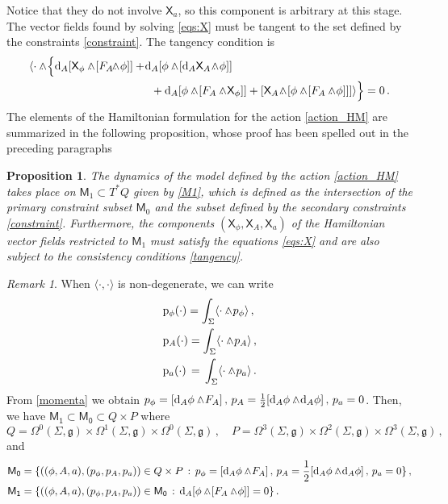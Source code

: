 \documentclass[12pt]{amsart}
\theoremstyle{plain}
\newtheorem{proposition}[theorem]{Proposition}
\theoremstyle{definition}
\theoremstyle{remark}
\newtheorem{remark}[theorem]{Remark}
\newcommand{\wed}{\wedge\hspace*{-7.5pt}.\hspace*{3pt}}
\numberwithin{equation}{section}  %
\begin{document}
Notice that they do not involve $\mathsf{X}_{a}$, so this component is arbitrary at this stage. The vector fields found by solving \eqref{eqs:X} must be tangent to the set defined by the constraints \eqref{constraint}. The tangency condition is
\begin{align}
  \label{tangency}\begin{split}
&\langle\cdot\wed \Big\{{\mathrm{d}_A[\mathsf{X}_\phi\wed[F_A\!\!\wed\phi]]}+\!{\mathrm{d}_A[\phi\wed [\mathrm{d}_A \mathsf{X}_A\!\wed \phi]]}\\
&\hspace{3.8cm}+{\mathrm{d}_A[\phi\wed[F_A \wed \mathsf{X}_\phi]]}+{[\mathsf{X}_A \!\wed [\phi\wed[F_A \wed\phi]]]}\rangle\Big\}=0\,. \end{split}
\end{align}
The elements of the Hamiltonian formulation for the action \eqref{action_HM} are summarized in the following proposition, whose proof has been spelled out in the preceding paragraphs
\begin{proposition}\label{th_Hamiltonian}
The dynamics of the model defined by the action \eqref{action_HM} takes place on $\mathsf{M}_1\subset T^*Q$ given by \eqref{M1}, which is defined as the intersection of the primary constraint subset $\mathsf{M}_0$ and the subset defined by the secondary constraints \eqref{constraint}. Furthermore, the components $(\mathsf{X}_\phi,\mathsf{X}_A, \mathsf{X}_{a})$ of the Hamiltonian vector fields restricted to $\mathsf{M}_1$ must satisfy the equations \eqref{eqs:X} and are also subject to the consistency conditions \eqref{tangency}.
\end{proposition}
\begin{remark}\label{remark_ps} When \(\langle \cdot,\!\cdot\rangle\) is non-degenerate, we can write  
\begin{align*}
&\mathrm{p}_\phi(\cdot)=\int_\Sigma\langle \cdot\wed p_\phi \rangle\,, \nonumber\\
&\mathrm{p}_A(\cdot)=\int_\Sigma \langle \cdot \wed p_A \rangle\,,\\
&\mathrm{p}_{a}(\cdot)\,=\,\int_\Sigma\langle \cdot\wed p_a \rangle\,. 
\end{align*}
From \eqref{momenta} we obtain \(p_\phi=[\mathrm{d}_A\phi\wed F_A]\,,\, p_A=\frac{1}{2}[\mathrm{d}_A\phi\wed \mathrm{d}_A\phi]\,, \, p_a=0\). Then, we have \(\mathsf{M_1}\subset\mathsf{M_0}\subset Q\times P\) where
\[
Q=\Omega^0(\Sigma,\mathfrak{g})\times\Omega^1(\Sigma,\mathfrak{g})\times\Omega^0(\Sigma,\mathfrak{g})\,,\quad 
P=\Omega^3(\Sigma,\mathfrak{g})\times\Omega^2(\Sigma,\mathfrak{g})\times\Omega^3(\Sigma,\mathfrak{g})\,, 
\]
and
\begin{align*}
 \mathsf{M_0}&=\{((\phi,A,a),(p_\phi,p_A,p_a))\in Q\times P\,:\, p_\phi=[\mathrm{d}_A\phi\wed F_A]\,,\, p_A=\frac{1}{2}[\mathrm{d}_A\phi\wed \mathrm{d}_A\phi]\,, \, p_a=0 \}\,, \\
  \mathsf{M_1}&=\{((\phi,A,a),(p_\phi,p_A,p_a))\in \mathsf{M_0}\,:\, \mathrm{d}_A[\phi\wed[F_A\wed\phi]]=0 \} \,.
\end{align*}
  
\end{remark}
\end{document}

